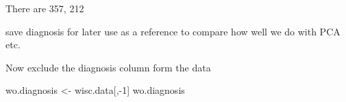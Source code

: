 \documentclass[
  letterpaper,
  DIV=11,
  numbers=noendperiod]{scrartcl}
\newenvironment{Shaded}{\begin{snugshade}}{\end{snugshade}}
\newcommand{\CommentTok}[1]{\textcolor[rgb]{0.37,0.37,0.37}{#1}}
\newcommand{\DecValTok}[1]{\textcolor[rgb]{0.68,0.00,0.00}{#1}}
\newcommand{\FunctionTok}[1]{\textcolor[rgb]{0.28,0.35,0.67}{#1}}
\newcommand{\NormalTok}[1]{\textcolor[rgb]{0.00,0.23,0.31}{#1}}
\newcommand{\OtherTok}[1]{\textcolor[rgb]{0.00,0.23,0.31}{#1}}
\newcommand{\SpecialCharTok}[1]{\textcolor[rgb]{0.37,0.37,0.37}{#1}}
\begin{document}
There are 357, 212

save diagnosis for later use as a reference to compare how well we do
with PCA etc.

\begin{Shaded}
\end{Shaded}

Now exclude the diagnosis column form the data

\begin{Shaded}
\begin{Highlighting}[]
\NormalTok{wo.diagnosis }\OtherTok{\textless{}{-}}\NormalTok{ wisc.data[,}\SpecialCharTok{{-}}\DecValTok{1}\NormalTok{]}
\NormalTok{wo.diagnosis}
\end{Highlighting}
\end{Shaded}
\end{document}
